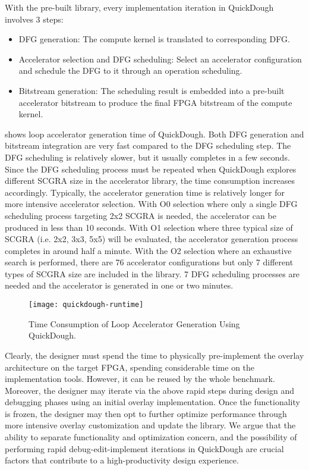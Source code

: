 With the pre-built library, every implementation iteration in QuickDough involves 3 steps:
\begin{itemize}
\item DFG generation: The compute kernel is translated to corresponding DFG.
\item Accelerator selection and DFG scheduling: Select an accelerator configuration and schedule the DFG to it through an operation scheduling. 
\item Bitstream generation: The scheduling result is embedded into a pre-built accelerator bitstream 
to produce the final FPGA bitstream of the compute kernel.
\end{itemize}

 shows loop accelerator generation time of QuickDough.
Both DFG generation and bitstream integration are very fast compared to the DFG scheduling step. The DFG
scheduling is relatively slower, but it usually completes in a few seconds.
Since the DFG scheduling process must be repeated when QuickDough explores different SCGRA size in
the accelerator library, the time consumption increases accordingly. Typically, the accelerator
generation time is relatively longer for more intensive accelerator selection. With O0 selection
where only a single DFG scheduling process targeting 2x2 SCGRA is needed, the accelerator can be
produced in less than 10 seconds. With O1 selection where three typical size of SCGRA (i.e. 2x2,
3x3, 5x5) will be evaluated, the accelerator
generation process completes in around half a minute. With the O2 selection where an exhaustive
search is performed, there are 76 accelerator configurations but only 7 different types of SCGRA
size are included in the library. 7 DFG scheduling processes are needed and the accelerator is
generated in one or two minutes.

\begin{figure}
\centering
\texttt{[image: quickdough-runtime]}
\caption{Time Consumption of Loop Accelerator Generation Using QuickDough.}
\label{fig:SCGRA-Overlay-Compilation-Time}
\end{figure}

Clearly, the designer must spend the time to physically pre-implement the overlay architecture on the target FPGA, spending considerable time on the implementation tools. However, it can be reused by the whole benchmark. Moreover, the designer may iterate via the above rapid steps during design and debugging phases using an initial overlay implementation. Once the functionality is frozen, the designer may then opt to further optimize performance through more intensive overlay customization and update the library. We argue that the ability to separate functionality and optimization concern, and the possibility of performing rapid debug-edit-implement iterations in QuickDough are crucial factors that contribute to a high-productivity design experience.

